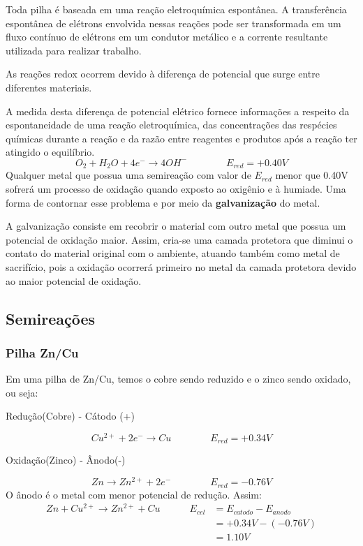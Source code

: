 \documentclass{article}
\begin{document}
Toda pilha é baseada em uma reação eletroquímica espontânea. A transferência espontânea de elétrons envolvida nessas reações pode ser transformada em um fluxo contínuo de elétrons em um condutor metálico e a corrente resultante utilizada para realizar trabalho.
\begin{boxedd}
  As reações redox ocorrem devido à diferença de potencial que surge entre diferentes materiais.
\end{boxedd}
A medida desta diferença de potencial elétrico fornece informações a respeito da espontaneidade de uma reação eletroquímica, das concentrações das respécies químicas durante a reação e da razão entre reagentes e produtos após a reação ter atingido o equilíbrio.
\begin{equation}
  O_{2} +H_2O + 4e^- \rightarrow 4OH^-   \quad\quad\quad\quad E_{red}=+0.40V
\end{equation} 
Qualquer metal que possua uma semireação com valor de $E_{red}$ menor que 0.40V sofrerá um processo de oxidação quando exposto ao oxigênio e à humiade. Uma forma de contornar esse problema e por meio da \textbf{galvanização} do metal.

A galvanização consiste em recobrir o material com outro metal que possua um potencial de oxidação maior. Assim, cria-se uma camada protetora que diminui o contato do material original com o ambiente, atuando também como metal de sacrifício, pois a oxidação ocorrerá primeiro no metal da camada protetora devido ao maior potencial de oxidação.

\subsection{Semireações}
\subsubsection{Pilha Zn/Cu}
Em uma pilha de Zn/Cu, temos o cobre sendo reduzido e o zinco sendo oxidado, ou seja:
\begin{center}
  Redução(Cobre) - Cátodo (+)
\end{center}
\begin{equation}
  Cu^{2+}+2e^- \rightarrow Cu  \quad\quad\quad\quad E_{red}=+0.34V
\end{equation}
\begin{center}
  Oxidação(Zinco) - Ânodo(-)
\end{center}
\begin{equation}
  Zn \rightarrow Zn^{2+}+2e^- \quad\quad\quad\quad E_{red}=-0.76V
\end{equation}
O ânodo é o metal com menor potencial de redução.
Assim:
\begin{align*}
  Zn+Cu^{2+}\rightarrow Zn^{2+}+Cu \quad\quad\quad E_{cel}&=E_{catodo}-E_{anodo}\\
&=+0.34V-(-0.76V)\\
&=1.10V
\end{align*}
\end{document}
